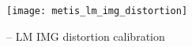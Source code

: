 \begin{figure}[hb]
  \centering
  \texttt{[image: metis\_lm\_img\_distortion]}
  \caption[Recipe: ]{%
     -- LM IMG distortion calibration}
  \label{fig:metis_lm_img_distortion}
\end{figure}

\FloatBarrier

